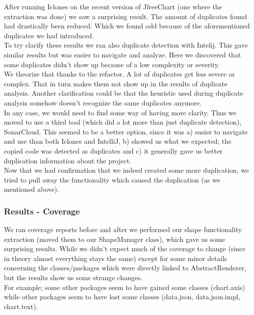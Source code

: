 \documentclass{article}
\begin{document}
After running Iclones on the recent version of JfreeChart (one where the extraction was done) we saw a surprising result. The amount of duplicates found had drastically been reduced. Which we found odd because of the aforementioned duplicates we had introduced.\\

To try clarify these results we ran also duplicate detection with Intelij. This gave similar results but was easier to navigate and analyze. Here we discovered that some duplicates didn't show up because of a low complexity or severity.\\

We theorize that thanks to the refactor. A lot of duplicates get less severe or complex. That in turn makes them not show up in the results of duplicate analysis. Another clarification could be that the heuristic used during duplicate analysis somehow doesn't recognize the same duplicates anymore.\\

\noindent
In any case, we would need to find some way of having more clarity. Thus we moved to use a third tool (which did a lot more than just duplicate detection), SonarCloud. This seemed to be a better option, since it was a) easier to navigate and use than both Iclones and IntelliJ, b) showed us what we expected; the copied code was detected as duplicates and c) it generally gave us better duplication information about the project.\\

Now that we had confirmation that we indeed created some more duplication, we tried to pull away the functionality which caused the duplication (as we mentioned above).

\subsubsection{Results - Coverage}

We ran coverage reports before and after we performed our shape functionality extraction (moved them to our ShapeManager class), which gave us some surprising results. While we didn't expect much of the coverage to change (since in theory almost everything stays the same) except for some minor details concerning the classes/packages which were directly linked to AbstractRenderer, but the results show us some strange changes.\\

For example; some other packages seem to have gained some classes (chart.axis) while other packages seem to have lost some classes (data.json, data.json.impl, chart.text).
\end{document}
